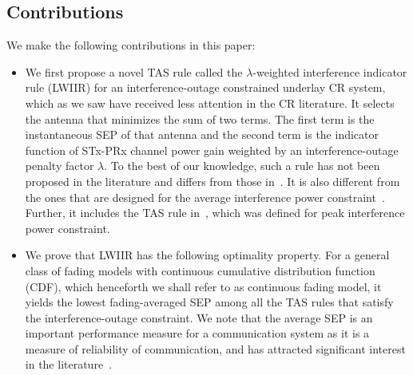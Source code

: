 \documentclass[12pt,draftcls,peerreview,onecolumn]{IEEEtran}
\newcommand{\lam}{\lambda}
\begin{document}
\subsection{Contributions} 
We make the following contributions in this paper:
\begin{itemize}
\item We first propose a novel TAS rule called the $\lam$-weighted interference indicator rule (LWIIR) for an interference-outage constrained underlay CR system, which as we saw have received less attention in the CR literature. It selects the antenna that minimizes the sum of two terms. The first term is the instantaneous SEP of that antenna and the second term is the indicator function of STx-PRx channel power gain weighted by an interference-outage penalty factor $\lam$. To the best of our knowledge, such a rule has not been proposed in the literature and differs from those in~\cite{Wang_2011_TCom,Dmochowski_2011_CROWNCOM,Wang_2010_TWC}. It is also different from the ones that are designed for the average interference power constraint~\cite{Sarvendranath_2013_TCOM,Sarvendranath_2014_TCOM}. Further, it includes the TAS rule in~\cite{Hanif_2015_globecom}, which was defined for peak interference power constraint. 

\item We prove that LWIIR has the following optimality property.  For a general  class of fading models with continuous cumulative distribution function (CDF), which henceforth we shall refer to as continuous fading model, it yields the lowest fading-averaged SEP among all the TAS rules that satisfy the interference-outage constraint. We note that the average SEP is an important performance measure for a communication system as it is a measure of reliability of communication, and has attracted significant interest in the literature~\cite{Kashyap_2014_TCOM,Sarvendranath_2013_TCOM,Sarvendranath_2014_TCOM,li_2011_pimrc}. 


\end{itemize}
\end{document}
